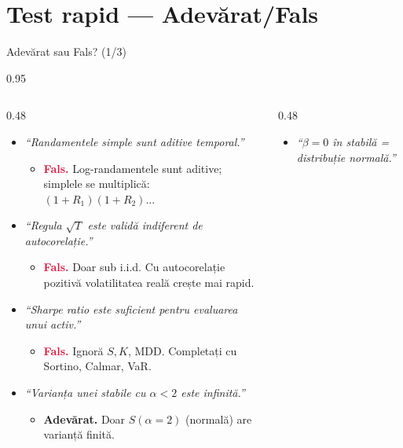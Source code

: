 \documentclass[9pt, aspectratio=169, t]{beamer}
\begin{document}
\section{Test rapid --- Adevărat/Fals}

\begin{frame}[shrink=25]{Adevărat sau Fals? (1/3)}
\begin{cminipage}{0.95\textwidth}
\begin{columns}[T]
\begin{column}{0.48\textwidth}
\begin{itemize}\setlength{\itemsep}{1pt}
    \item \textit{``Randamentele simple sunt aditive temporal.''}
    \begin{itemize}\setlength{\itemsep}{0pt}
        \item[] \textcolor{Crimson}{\textbf{Fals.}} Log-randamentele sunt aditive; simplele se multiplică: $(1+R_1)(1+R_2)\ldots$
    \end{itemize}
    \item \textit{``Regula $\sqrt{T}$ este validă indiferent de autocorelație.''}
    \begin{itemize}\setlength{\itemsep}{0pt}
        \item[] \textcolor{Crimson}{\textbf{Fals.}} Doar sub i.i.d. Cu autocorelație pozitivă volatilitatea reală crește mai rapid.
    \end{itemize}
    \item \textit{``Sharpe ratio este suficient pentru evaluarea unui activ.''}
    \begin{itemize}\setlength{\itemsep}{0pt}
        \item[] \textcolor{Crimson}{\textbf{Fals.}} Ignoră $S, K$, MDD. Completați cu Sortino, Calmar, VaR.
    \end{itemize}
    \item \textit{``Varianța unei stabile cu $\alpha < 2$ este infinită.''}
    \begin{itemize}\setlength{\itemsep}{0pt}
        \item[] \textcolor{Forest}{\textbf{Adevărat.}} Doar $S(\alpha = 2)$ (normală) are varianță finită.
    \end{itemize}
\end{itemize}
\end{column}
\begin{column}{0.48\textwidth}
\begin{itemize}\setlength{\itemsep}{1pt}
    \item \textit{``$\beta = 0$ în stabilă = distribuție normală.''}

\end{itemize}
\end{column}
\end{columns}
\end{cminipage}
\end{frame}
\end{document}
